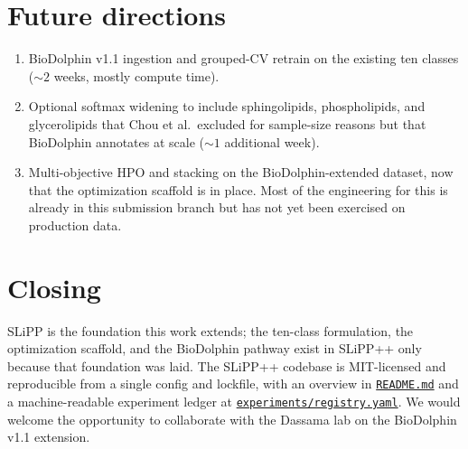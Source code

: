 \documentclass[11pt]{article}
\begin{document}
\section{Future directions}

\begin{enumerate}
\item BioDolphin v1.1 ingestion and grouped-CV retrain on the existing ten classes ($\sim\!2$ weeks, mostly compute time).
\item Optional softmax widening to include sphingolipids, phospholipids, and glycerolipids that Chou et al.\ excluded for sample-size reasons but that BioDolphin annotates at scale ($\sim\!1$ additional week).
\item Multi-objective HPO and stacking on the BioDolphin-extended dataset, now that the optimization scaffold is in place. Most of the engineering for this is already in this submission branch but has not yet been exercised on production data.
\end{enumerate}

\section{Closing}

SLiPP \cite{chou2025} is the foundation this work extends; the ten-class formulation, the optimization scaffold, and the BioDolphin pathway exist in SLiPP++ only because that foundation was laid. The SLiPP++ codebase is MIT-licensed and reproducible from a single config and lockfile, with an overview in \href{README.md}{\texttt{README.md}} and a machine-readable experiment ledger at \href{experiments/registry.yaml}{\texttt{experiments/registry.yaml}}. We would welcome the opportunity to collaborate with the Dassama lab on the BioDolphin v1.1 extension.

\vspace{0.6em}

{\small

}
\end{document}
